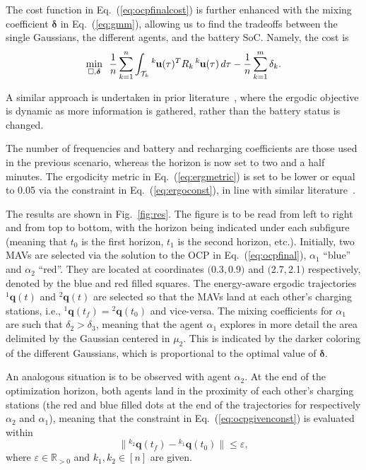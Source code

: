 \documentclass[letterpaper,10pt,conference,twoside]{IEEEtran}
\theoremstyle{definition}
\begin{document}
The cost function in Eq.~(\ref{eq:ocpfinalcost}) is further enhanced with the mixing coefficient $\boldsymbol{\delta}$ in Eq.~(\ref{eq:gmm}), allowing us to find the tradeoffs between the single Gaussians, the different agents, and the battery SoC. Namely, the cost is
\begin{equation}
  \min_{\square,\boldsymbol{\delta}}\,\,\,{\frac{1}{n}\sum_{k=1}^{n}\int_{\mathcal{T}_k}{}^k\hspace*{-.1ex}\mathbf{u}(\tau)^TR_k\,{}^k\hspace*{-.1ex}\mathbf{u}(\tau)\,d\tau-\frac{1}{n}\sum_{k=1}^{m}\delta_k}.
\end{equation}

A similar approach is undertaken in prior literature~\cite{rao2023multi}, where the ergodic objective is dynamic as more information is gathered, rather than the battery status is changed.

The number of frequencies and battery and recharging coefficients are those used in the previous scenario, whereas the horizon is now set to two and a half minutes.
The ergodicity metric in Eq.~(\ref{eq:ergmetric}) is set to be lower or equal to 0.05 via the constraint in Eq.~(\ref{eq:ergoconst}), in line with similar literature~\cite{dong2023time}.

The results are shown in Fig.~\ref{fig:res}. The figure is to be read from left to right and from top to bottom, with the horizon being indicated under each subfigure (meaning that $t_0$ is the first horizon, $t_1$ is the second horizon, etc.). Initially, two MAVs are selected via the solution to the OCP in Eq.~(\ref{eq:ocpfinal}), $\alpha_1$ ``blue'' and $\alpha_2$ ``red''. They are located at coordinates $($0.3$,$0.9$)$ and $($2.7$,$2.1$)$ respectively, denoted by the blue and red filled squares. The energy-aware ergodic trajectories ${}^1\mathbf{q}(t)$ and ${}^2\mathbf{q}(t)$ are selected so that the MAVs land at each other's charging stations, i.e., ${}^1\mathbf{q}(t_f)={}^2\mathbf{q}(t_0)$ and vice-versa. The mixing coefficients for $\alpha_1$ are such that $\delta_2>\delta_3$, meaning that the agent $\alpha_1$ explores in more detail the area delimited by the Gaussian centered in $\mu_2$. This is indicated by the darker coloring of the different Gaussians, which is proportional to the optimal value of $\boldsymbol{\delta}$. 

An analogous situation is to be observed with agent $\alpha_2$. At the end of the optimization horizon, both agents land in the proximity of each other's charging stations (the red and blue filled dots at the end of the trajectories for respectively $\alpha_2$ and $\alpha_1$), meaning that the constraint in Eq.~(\ref{eq:ocpgivenconst}) is evaluated within
\begin{equation}
  \lVert{}^{k_2}\mathbf{q}(t_f)-{}^{k_1}\mathbf{q}(t_0)\rVert\leq\varepsilon,
\end{equation} 
where $\varepsilon\in\mathbb{R}_{>0}$ and $k_1,k_2\in[n]$ are given.
\end{document}
